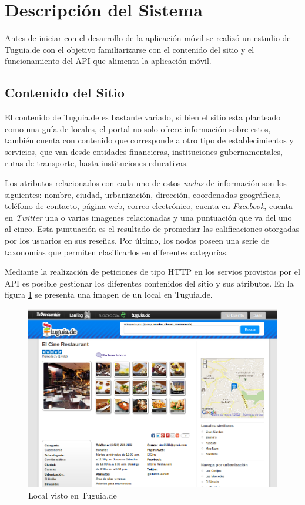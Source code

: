 \section{Descripción del Sistema} \label{subsect:descripcion}
Antes de iniciar con el desarrollo de la aplicación móvil se realizó un estudio de Tuguia.de con el objetivo familiarizarse con el contenido del sitio y el funcionamiento del API que alimenta la aplicación móvil.

\subsection{Contenido del Sitio}
El contenido de Tuguia.de es bastante variado, si bien el sitio esta planteado como una guía de locales, el portal no solo ofrece información sobre estos, también cuenta con contenido que corresponde a otro tipo de establecimientos y servicios, que van desde entidades financieras, instituciones gubernamentales, rutas de transporte, hasta  instituciones educativas. 

Los atributos relacionados con cada uno de estos \textit{nodos} de información son los siguientes: nombre, ciudad, urbanización, dirección, coordenadas geográficas, teléfono de contacto, página web, correo electrónico, cuenta en \textit{Facebook}, cuenta en \textit{Twitter} una o varias imagenes relacionadas y una puntuación que va del uno al cinco. Esta puntuación es el resultado de promediar las calificaciones otorgadas por los usuarios en sus reseñas. Por último, los nodos poseen una serie de taxonomías que permiten clasificarlos en diferentes categorías. 

Mediante la realización de peticiones de tipo HTTP en los servios provistos por el API es posible gestionar los diferentes contenidos del sitio y sus atributos. En la figura \ref{fig:localtgd} se presenta una imagen de un local en Tuguia.de.

\begin{figure}[h]
	\begin{center}
		\includegraphics[scale=0.45]{imagenes/local_tgd.png}
	\end{center}
	\caption{
		\label{fig:localtgd}
		Local visto en Tuguia.de \cite{CTGD}
	}
\end{figure}


